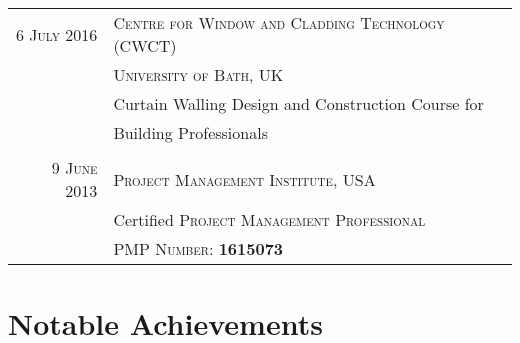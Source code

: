 \documentclass[a4paper,11pt]{article} %
\begin{document}
\begin{tabular}{r|l}
\hspace{9.5mm}\textsc{6 July} 2016 & \textsc{Centre for Window and Cladding Technology (CWCT)}\\
& \textsc{University of Bath, UK}\\
& Curtain Walling Design and Construction Course for \\
& Building Professionals \\
\multicolumn{2}{c}{} \\


\hspace{9.5mm}\textsc{9 June} 2013 & \textsc{Project Management Institute}, USA\\
& Certified \textsc{Project Management Professional}\\
& \textsc{PMP Number:} \textbf{1615073}\\

\end{tabular}


\vspace{1cm}
\section{Notable Achievements}
\end{document}
